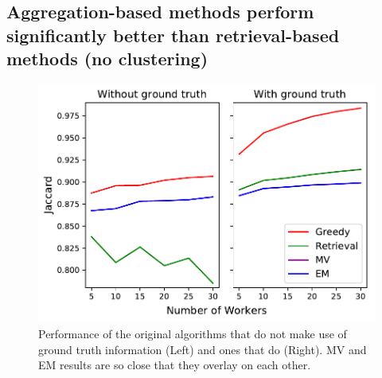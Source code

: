 \subsection{Aggregation-based methods perform significantly better than retrieval-based methods (no clustering)}
\begin{figure}[h!]
   \centering
   \includegraphics[trim={0 1pt 4pt 0},clip,width=0.8\linewidth]{plots/Retrieval_vs_Aggregation.pdf}
   \caption{Performance of the original algorithms that do not make use of ground truth information (Left) and ones that do (Right). MV and EM results are so close that they overlay on each other.} %
   \label{retrieval_vs_aggregation}   
\end{figure} 
